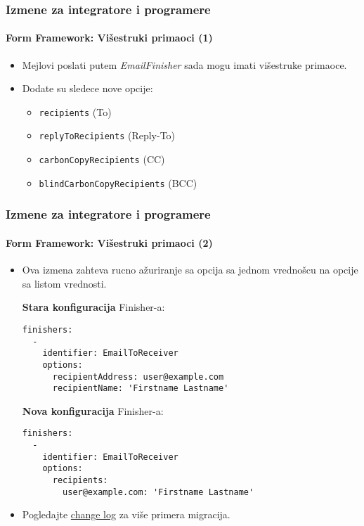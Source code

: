 \begin{frame}[fragile]
	\frametitle{Izmene za integratore i programere}
	\framesubtitle{Form Framework: Višestruki primaoci (1)}

	\begin{itemize}
		\item Mejlovi poslati putem \textit{EmailFinisher} sada mogu imati višestruke primaoce.

		\item Dodate su sledece nove opcije:

			\begin{itemize}
				\item \texttt{recipients} (To)
				\item \texttt{replyToRecipients} (Reply-To)
				\item \texttt{carbonCopyRecipients} (CC)
				\item \texttt{blindCarbonCopyRecipients} (BCC)
			\end{itemize}

	\end{itemize}

\end{frame}


\begin{frame}[fragile]
	\frametitle{Izmene za integratore i programere}
	\framesubtitle{Form Framework: Višestruki primaoci (2)}

	\lstset{basicstyle=\tiny\ttfamily}

	\begin{itemize}
		\item Ova izmena zahteva rucno ažuriranje sa opcija sa jednom vrednošcu na opcije sa
		listom vrednosti.

		\smaller\textbf{Stara konfiguracija} Finisher-a:\normalsize

\begin{lstlisting}
finishers:
  -
    identifier: EmailToReceiver
    options:
      recipientAddress: user@example.com
      recipientName: 'Firstname Lastname'
\end{lstlisting}

		\smaller\textbf{Nova konfiguracija} Finisher-a:\normalsize

\begin{lstlisting}
finishers:
  -
    identifier: EmailToReceiver
    options:
      recipients:
        user@example.com: 'Firstname Lastname'
\end{lstlisting}

		\item Pogledajte \href{https://docs.typo3.org/c/typo3/cms-core/10.0/en-us/Changelog/master/Deprecation-80420-EmailFinisherSingleAddressOptions.html}{change log}
			za više primera migracija.

	\end{itemize}

\end{frame}

